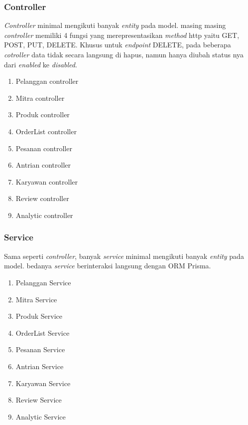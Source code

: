 \subsubsection{Controller}
\textit{Controller} minimal mengikuti banyak \textit{entity} pada model. masing masing \textit{controller} memiliki 4 fungsi yang merepresentasikan \textit{method} http yaitu GET, POST, PUT, DELETE. Khusus untuk \textit{endpoint} DELETE, pada beberapa \textit{cotroller} data tidak secara langsung di hapus, namun hanya diubah status nya dari \textit{enabled} ke \textit{disabled}.
\begin{enumerate}
  \item Pelanggan controller
  \item Mitra controller
  \item Produk controller
  \item OrderList controller
  \item Pesanan controller
  \item Antrian controller
  \item Karyawan controller
  \item Review controller
  \item Analytic controller
\end{enumerate}

\subsubsection{Service}
Sama seperti \textit{controller}, banyak \textit{service} minimal mengikuti banyak \textit{entity} pada model.
bedanya \textit{service} berinteraksi langsung dengan ORM Prisma.
\begin{enumerate}
  \item Pelanggan Service
  \item Mitra Service
  \item Produk Service
  \item OrderList Service
  \item Pesanan Service
  \item Antrian Service
  \item Karyawan Service
  \item Review Service
  \item Analytic Service
\end{enumerate}

